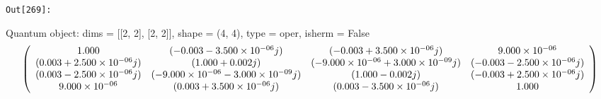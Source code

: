 \documentclass[11pt]{article}
\begin{document}
\texttt{\color{outcolor}Out[{\color{outcolor}269}]:}
    
    Quantum object: dims = [[2, 2], [2, 2]], shape = (4, 4), type = oper, isherm = False\begin{equation*}\left(\begin{array}{*{11}c}1.000 & (-0.003-3.500\times10^{-06}j) & (-0.003+3.500\times10^{-06}j) & 9.000\times10^{-06}\\(0.003+2.500\times10^{-06}j) & (1.000+0.002j) & (-9.000\times10^{-06}+3.000\times10^{-09}j) & (-0.003-2.500\times10^{-06}j)\\(0.003-2.500\times10^{-06}j) & (-9.000\times10^{-06}-3.000\times10^{-09}j) & (1.000-0.002j) & (-0.003+2.500\times10^{-06}j)\\9.000\times10^{-06} & (0.003+3.500\times10^{-06}j) & (0.003-3.500\times10^{-06}j) & 1.000\\\end{array}\right)\end{equation*}

    
\end{document}

